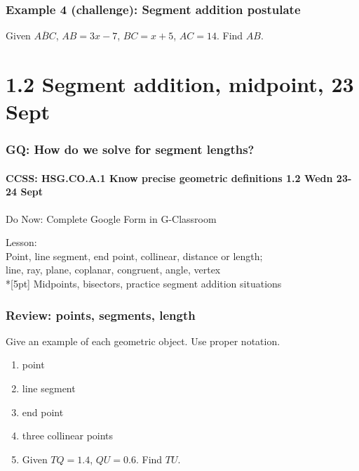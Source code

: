 \documentclass{beamer}
\begin{document}
  \frame
  {
    \frametitle{Example 4 (challenge): Segment addition postulate}
    
    Given $\overline{ABC}$, $AB=3x-7$, $BC=x+5$, $AC=14$. Find ${AB}$.\\[0.5in]
        \vspace{1cm}
  }

  \section{1.2 Segment addition, midpoint, 23 Sept}
  \frame
  {
    \frametitle{GQ: How do we solve for segment lengths?}
    \framesubtitle{CCSS: HSG.CO.A.1 Know precise geometric definitions  \hfill \alert{1.2 Wedn 23-24 Sept}}
  
    \begin{block}{Do Now: Complete Google Form in G-Classroom}
    \end{block}
    Lesson: \\ Point, line segment, end point, collinear, distance or length; \\ line, ray, plane, coplanar, congruent, angle, vertex \\*[5pt]
    Midpoints, bisectors, practice segment addition situations
  }

  \frame
  {
    \frametitle{Review: points, segments, length}
    Give an example of each geometric object. Use proper notation.
    \begin{enumerate}
      \item point
      \item line segment
      \item end point
      \item three collinear points
      \item Given $TQ=1.4$, $QU=0.6$. Find $TU$.
    \end{enumerate}
  }
\end{document}

